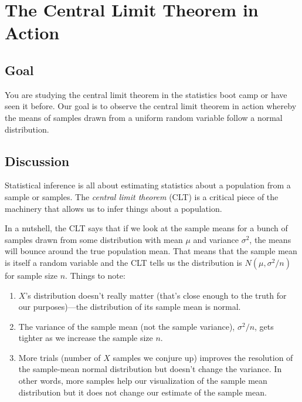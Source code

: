 \documentclass[titlepage]{tufte-book}
\newcounter{problem}
\begin{document}
\chapter{The Central Limit Theorem in Action}

\setcounter{problem}{1}

\section{Goal}

\begin{fullwidth}

You are studying the central limit theorem in the statistics boot camp or have seen it before. Our goal is to observe the central limit theorem in action whereby the means of samples drawn from a uniform random variable follow a normal distribution.

\section{Discussion}

Statistical inference is all about estimating statistics about a population from a sample or samples. The {\em central limit theorem} (CLT) is a critical piece of the machinery that allows us to infer things about a population. 

In a nutshell, the CLT says that if we look at the sample means for a bunch of samples drawn from some distribution with mean $\mu$ and variance $\sigma^2$, the means will bounce around the true population mean.  That means that the sample mean is  itself a random variable and the CLT tells us the distribution is $N(\mu, \sigma^2/n)$ for sample size $n$.  Things to note:

\begin{enumerate}
\item $X$'s distribution doesn't really matter (that's close enough to the truth for our purposes)---the distribution of its sample mean is normal. 

\item The variance of the sample mean (not the sample variance), $\sigma^2/n$, gets tighter as we increase the sample size $n$.

\item More trials (number of $X$ samples we conjure up) improves the resolution of the sample-mean normal distribution but doesn't change the variance. In other words,  more samples help our visualization of the sample mean distribution but it does not change our estimate of the sample mean.
\end{enumerate}


\end{fullwidth}
\end{document}
